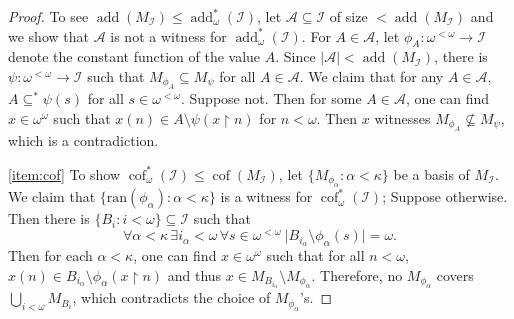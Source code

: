 \documentclass[a4paper,12pt]{amsart}
\theoremstyle{definition}
\numberwithin{thm}{section}
\numberwithin{equation}{section}
\DeclareMathOperator{\add}{add}
\DeclareMathOperator{\cof}{cof}
\newcommand{\I}{\mathscr{I}}
\renewcommand{\subset}{\subseteq}
\begin{document}
\begin{proof}
        To see $\add(M_\I)\leq\add_\omega^*(\I)$, let $\mathcal{A}\subset\I$ of size $<\add(M_\I)$ and we show that $\mathcal{A}$ is not a witness for $\add_\omega^*(\I)$. For $A\in\mathcal{A}$, let $\phi_A\colon\omega^{<\omega}\to\I$ denote the constant function of the value $A$. Since $\lvert\mathcal{A}\rvert<\add(M_\I)$, there is $\psi\colon\omega^{<\omega}\to\I$ such that $M_{\phi_A}\subset M_\psi$ for all $A\in\mathcal{A}$. We claim that for any $A\in\mathcal{A}$, $A\subset^*\psi(s)$ for all $s\in\omega^{<\omega}$. Suppose not. Then for some $A\in\mathcal{A}$, one can find $x\in\omega^\omega$ such that $x(n)\in A\setminus \psi(x\upharpoonright n)$ for $n<\omega$. Then $x$ witnesses $M_{\phi_A}\not\subset M_\psi$, which is a contradiction.
    
        \eqref{item:cof} To show $\cof^*_\omega(\I)\leq\cof(M_{\I})$, let $\{M_{\phi_\alpha}:\alpha<\kappa\}$ be a basis of $M_\I$. We claim that $\{\mathrm{ran}(\phi_\alpha):\alpha<\kappa\}$ is a witness for $\cof^*_\omega(\I)$; Suppose otherwise. Then there is $\{B_i:i<\omega\}\subset\I$ such that
        \[
        \forall\alpha<\kappa\,\exists i_\alpha < \omega\,\forall s\in\omega^{<\omega}~\lvert B_{i_\alpha}\setminus\phi_\alpha(s)\rvert = \omega.
        \]
        Then for each $\alpha < \kappa$, one can find $x\in\omega^\omega$ such that for all $n<\omega$, $x(n)\in B_{i_\alpha}\setminus\phi_\alpha(x\upharpoonright n)$ and thus $x\in M_{B_{i_\alpha}}\setminus M_{\phi_\alpha}$. Therefore, no $M_{\phi_\alpha}$ covers $\bigcup_{i<\omega}M_{B_i}$, which contradicts the choice of $M_{\phi_\alpha}$'s. 


\end{proof}
\end{document}
